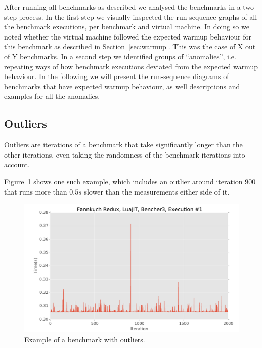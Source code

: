 \documentclass[10pt,preprint]{sigplanconf}
\begin{document}

After running all benchmarks as described we analysed the benchmarks in a
two-step process. In the first step we visually inspected the run sequence
graphs of all the benchmark executions, per benchmark and virtual machine. In
doing so we noted whether the virtual machine followed the expected warmup
behaviour for this benchmark as described in Section~\ref{sec:warmup}. This was
the case of  X out of Y benchmarks. In a second step we
identified groups of ``anomalies'', i.e. repeating ways of how benchmark
executions deviated from the expected warmup behaviour. In the following we will
present the run-sequence diagrams of benchmarks that have expected warmup
behaviour, as well descriptions and examples for all the anomalies.







\subsection{Outliers}
\label{sub:outliers}

Outliers are iterations of a benchmark that take significantly longer than the
other iterations, even taking the randomness of the benchmark iterations into
account.

Figure~\ref{fig:examples:outliers1} shows one such example, which includes an
outlier around iteration $900$ that runs more than $0.5s$ slower than the
measurements either side of it.

\begin{figure}[h!]
\centering
\includegraphics[width=.46\textwidth]{examples/outliers1}
\caption{Example of a benchmark with outliers.}
\label{fig:examples:outliers1}
\end{figure}
\end{document}
